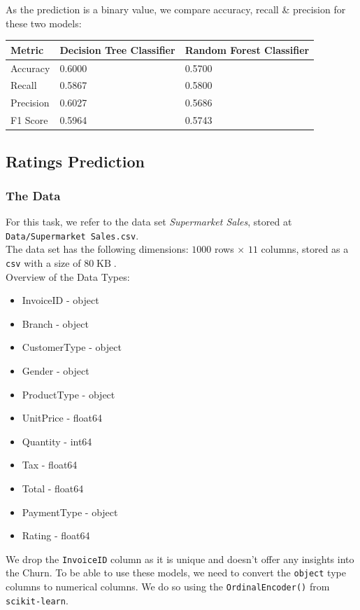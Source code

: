 \documentclass{article}
\begin{document}
    As the prediction is a binary value, we compare accuracy, recall \& precision for these two models:
    \begin{table}[h]
        \begin{center}
            \begin{tabular}{|l|l|l|}
                \hline
                Metric &Decision Tree Classifier &Random Forest Classifier \\
                \hline
                Accuracy &0.6000 &0.5700 \\
                Recall &0.5867 &0.5800 \\
                Precision &0.6027 &0.5686 \\
                F1 Score &0.5964 &0.5743 \\
                \hline
            \end{tabular}
        \end{center}
    \end{table}

\subsection{Ratings Prediction}

\subsubsection{The Data}
    For this task, we refer to the data set \textit{Supermarket Sales}, stored at \verb|Data/Supermarket Sales.csv|. \\
    The data set has the following dimensions: $1000$ rows $\times$ $11$ columns, stored as a \verb|csv| with a size of $80 \operatorname{KB}$. \\
    Overview of the Data Types:
    \begin{itemize}
        \item InvoiceID - object
        \item Branch - object
        \item CustomerType - object
        \item Gender - object
        \item ProductType - object
        \item UnitPrice - float64
        \item Quantity - int64
        \item Tax - float64
        \item Total - float64
        \item PaymentType - object
        \item Rating - float64
    \end{itemize}
    We drop the \verb|InvoiceID| column as it is unique and doesn't offer any insights into the Churn.
    To be able to use these models, we need to convert the \verb|object| type columns to numerical columns. We do so using the \verb|OrdinalEncoder()| from \verb|scikit-learn|. 
\end{document}
